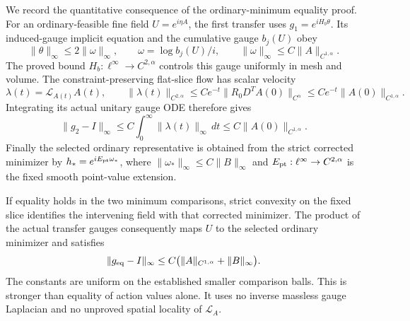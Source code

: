 We record the quantitative consequence of the ordinary-minimum equality
proof. For an ordinary-feasible fine field $U=e^{i\eta A}$, the first
transfer uses $g_1=e^{iH_b\theta}$. Its induced-gauge implicit equation
and the cumulative gauge $b_j(U)$ obey
\begin{equation}
 \|\theta\|_\infty\le2\|\omega\|_\infty,\qquad
 \omega=\log b_j(U)/i,\qquad
 \|\omega\|_\infty\le C\|A\|_{C^{1,\alpha}}.
 \label{csgq-first-transfer}
\end{equation}
The proved bound $H_b:\ell^\infty\to C^{2,\alpha}$ controls this gauge
uniformly in mesh and volume. The constraint-preserving flat-slice flow
has scalar velocity
\begin{equation}
 \lambda(t)=\mathcal L_{A(t)}A(t),\qquad
 \|\lambda(t)\|_{C^{2,\alpha}}
 \le C e^{-t}\|R_0D^T A(0)\|_{C^\alpha}
 \le C e^{-t}\|A(0)\|_{C^{1,\alpha}}.
 \label{csgq-flow}
\end{equation}
Integrating its actual unitary gauge ODE therefore gives
\begin{equation}
 \|g_2-I\|_\infty
 \le C\int_0^\infty\|\lambda(t)\|_\infty\,dt
 \le C\|A(0)\|_{C^{1,\alpha}}.
 \label{csgq-integrated-gauge}
\end{equation}
Finally the selected ordinary representative is obtained from the
strict corrected minimizer by
$h_*=e^{iE_{\rm pt}\omega_*}$, where
$\|\omega_*\|_\infty\le C\|B\|_\infty$ and
$E_{\rm pt}:\ell^\infty\to C^{2,\alpha}$ is the fixed smooth
point-value extension.

If equality holds in the two minimum comparisons, strict convexity on
the fixed slice identifies the intervening field with that corrected
minimizer. The product of the actual transfer gauges consequently maps
$U$ to the selected ordinary minimizer and satisfies
\begin{equation}
 \|g_{\rm eq}-I\|_\infty
       \le C\bigl(\|A\|_{C^{1,\alpha}}+\|B\|_\infty\bigr).
 \label{csgq-equality-gauge}
\end{equation}
The constants are uniform on the established smaller comparison balls.
This is stronger than equality of action values alone. It uses no
inverse massless gauge Laplacian and no unproved spatial locality of
$\mathcal L_A$.

